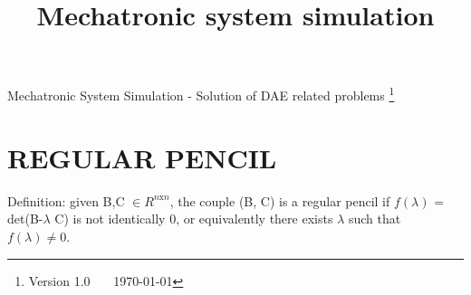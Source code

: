 \documentclass[a4paper,12pt]{article}
\title{Mechatronic system simulation}
\begin{document}
	{ \huge
		Mechatronic System Simulation - Solution of DAE related problems}
	\footnote{Version 1.0 \ \ \ \today}
	\section{REGULAR PENCIL}
Definition: given B,C $\in R^{n\text{x}n}$, the couple (B, C) is a regular pencil if $f(\lambda)$ = det(B-$\lambda$ C) is not identically 0, or equivalently there exists $\lambda$ such that $f(\lambda) \ne 0$. \\
\end{document}
